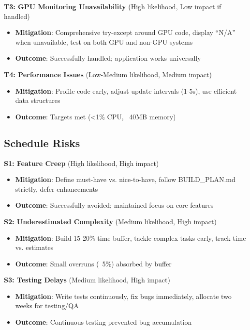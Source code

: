 \documentclass[12pt,a4paper,oneside]{report}
\begin{document}
\textbf{T3: GPU Monitoring Unavailability} (High likelihood, Low impact if handled)
\begin{itemize}
    \item \textbf{Mitigation}: Comprehensive try-except around GPU code, display ``N/A'' when unavailable, test on both GPU and non-GPU systems
    \item \textbf{Outcome}: Successfully handled; application works universally
\end{itemize}

\textbf{T4: Performance Issues} (Low-Medium likelihood, Medium impact)
\begin{itemize}
    \item \textbf{Mitigation}: Profile code early, adjust update intervals (1-5s), use efficient data structures
    \item \textbf{Outcome}: Targets met (<1\% CPU, ~40MB memory)
\end{itemize}

\subsection{Schedule Risks}

\textbf{S1: Feature Creep} (High likelihood, High impact)
\begin{itemize}
    \item \textbf{Mitigation}: Define must-have vs. nice-to-have, follow BUILD\_PLAN.md strictly, defer enhancements
    \item \textbf{Outcome}: Successfully avoided; maintained focus on core features
\end{itemize}

\textbf{S2: Underestimated Complexity} (Medium likelihood, High impact)
\begin{itemize}
    \item \textbf{Mitigation}: Build 15-20\% time buffer, tackle complex tasks early, track time vs. estimates
    \item \textbf{Outcome}: Small overruns (~5\%) absorbed by buffer
\end{itemize}

\textbf{S3: Testing Delays} (Medium likelihood, High impact)
\begin{itemize}
    \item \textbf{Mitigation}: Write tests continuously, fix bugs immediately, allocate two weeks for testing/QA
    \item \textbf{Outcome}: Continuous testing prevented bug accumulation
\end{itemize}
\end{document}
